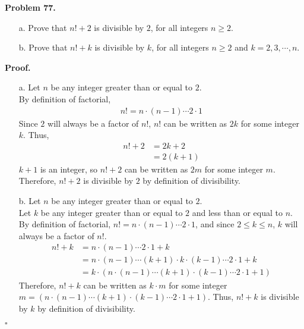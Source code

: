 \documentclass{article}
\newenvironment{problem}[1]{
    \begin{mdframed}[backgroundcolor=gray!20, skipabove=\baselineskip, skipbelow=\baselineskip, nobreak=true, innerleftmargin=10pt, innerrightmargin=10pt, innertopmargin=10pt, innerbottommargin=10pt]
    \textbf{Problem #1.}
}{
    \end{mdframed}
}
\newenvironment{proof}{
    \begin{mdframed}[nobreak=false, innerleftmargin=10pt, innerrightmargin=10pt, innertopmargin=10pt, innerbottommargin=10pt]
    \textbf{Proof.}
}{
    \hfill $\square$
    \end{mdframed}
}
\begin{document}
    \begin{problem}{77}
        \begin{enumerate}
            \item[a.] Prove that $n!+2$ is divisible by $2$, for all integers $n \geq 2$.
            \item[b.] Prove that $n!+k$ is divisible by $k$, for all integers $n \geq 2$ and $k=2,3, \cdots, n$.
        \end{enumerate}
    \end{problem}
    \begin{proof}
        \begin{enumerate}
            \item[a.]
                Let $n$ be any integer greater than or equal to $2$. \\
                By definition of factorial,
                \begin{align*}
                    n! = n \cdot (n-1) \cdots 2 \cdot 1 
                \end{align*}
                Since $2$ will always be a factor of $n!$, $n!$ can be written as $2k$ for some integer $k$.
                Thus,
                \begin{align*}
                    n! + 2 &= 2k + 2 \\
                    &= 2(k + 1)
                \end{align*}
                $k + 1$ is an integer, so $n! + 2$ can be written as $2m$ for some integer $m$. \\
                Therefore, $n! + 2$ is divisible by $2$ by definition of divisibility.
            \item[b.]
                Let $n$ be any integer greater than or equal to $2$. \\
                Let $k$ be any integer greater than or equal to $2$ and less than or equal to $n$. \\
                By definition of factorial, $n! = n \cdot (n-1) \cdots 2 \cdot 1$, and since $2 \leq k \leq n$, $k$ will always be a factor of $n!$. \\
                \begin{align*}
                    n! + k &= n \cdot (n-1) \cdots 2 \cdot 1 + k \\
                    &= n \cdot (n-1) \cdots (k+1) \cdot k \cdot (k-1) \cdots 2 \cdot 1 + k \\
                    &= k \cdot (n \cdot (n-1) \cdots (k+1) \cdot (k-1) \cdots 2 \cdot 1 + 1)
                \end{align*}
                Therefore, $n! + k$ can be written as $k \cdot m$ for some integer $m = (n \cdot (n-1) \cdots (k+1) \cdot (k-1) \cdots 2 \cdot 1 + 1)$.
                Thus, $n! + k$ is divisible by $k$ by definition of divisibility.
        \end{enumerate}
    \end{proof}
\end{document}
